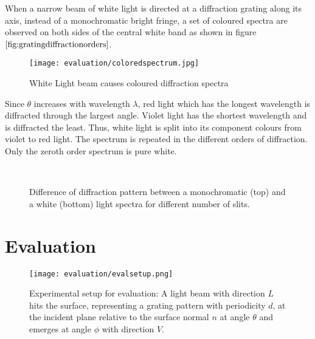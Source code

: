 When a narrow beam of white light is directed at a diffraction grating along its axis, instead of a monochromatic bright fringe, a set of coloured spectra are observed on both sides of the central white band as shown in figure $\ref{fig:gratingdiffractionorders}$.

\begin{figure}[H]
  \centering
  \texttt{[image: evaluation/coloredspectrum.jpg]}
  \label{fig:diffractionSpectrum}
  \caption{White Light beam causes coloured diffraction spectra}
\end{figure}

Since $\theta$ increases with wavelength $\lambda$, red light which has the longest wavelength is diffracted through the largest angle. Violet light has the shortest wavelength and is diffracted the least. Thus, white light is split into its component colours from violet to red light. The spectrum is repeated in the different orders of diffraction. Only the zeroth order spectrum is pure white.

\begin{figure}[H]
  \centering
~
~
~
  
  \label{fig:diffractionSlits}
  \caption{Difference of diffraction pattern between a monochromatic (top) and a white (bottom) light spectra for different number of slits.}
\end{figure}

\section{Evaluation}

\begin{figure}[H]
  \centering
  \texttt{[image: evaluation/evalsetup.png]}
  \caption{Experimental setup for evaluation: A light beam with direction $L$ hits the surface, representing a grating pattern with periodicity $d$, at the incident plane relative to the surface normal $n$ at angle $\theta$ and emerges at angle $\phi$ with direction $V$.}
  \label{fig:experimentalsetup}
\end{figure}

